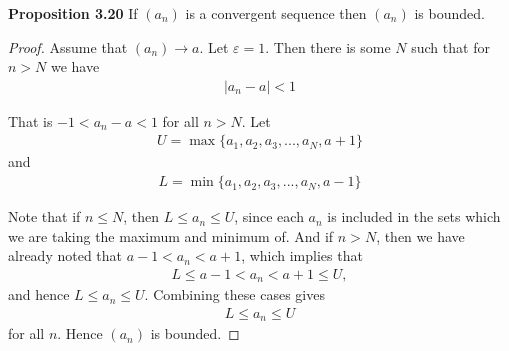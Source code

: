 \documentclass{article}
\begin{document}
\textbf{Proposition 3.20} If $(a_n)$ is a convergent sequence then $(a_n)$ is bounded.
\begin{proof}
	Assume that $(a_n) \rightarrow a$. Let $\varepsilon = 1$. Then there is some $N$ such that for $n > N$ we have
	\begin{align*}
		|a_n - a| < 1
	\end{align*}

	That is $-1 < a_n - a < 1$ for all $n > N$. Let
	\begin{align*}
		U = \max\{a_1, a_2, a_3, ..., a_N, a + 1\}
	\end{align*}
	and
	\begin{align*}
		L = \min\{a_1, a_2, a_3, ..., a_N, a - 1\}
	\end{align*}

	Note that if $n \le N$, then $L \le a_n \le U$, since each $a_n$ is included in the sets which we are taking the maximum
	and minimum of. And if $n > N$, then we have already noted that $a - 1 < a_n < a + 1$, which implies that
	\begin{align*}
		L \le a - 1 < a_n < a + 1 \le U,
	\end{align*}
	and hence $L \le a_n \le U$. Combining these cases gives
	\begin{align*}
		L \le a_n \le U
	\end{align*}
	for all $n$. Hence $(a_n)$ is bounded.
\end{proof}
\end{document}
